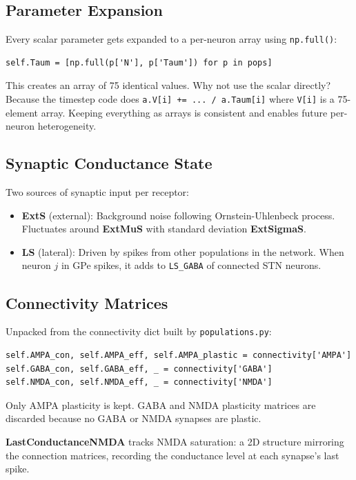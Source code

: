\documentclass[11pt,a4paper]{article}
\begin{document}
\subsection{Parameter Expansion}

Every scalar parameter gets expanded to a per-neuron array using \texttt{np.full()}:
\begin{lstlisting}
self.Taum = [np.full(p['N'], p['Taum']) for p in pops]
\end{lstlisting}

This creates an array of 75 identical values. Why not use the scalar directly? Because the timestep code does \texttt{a.V[i] += ... / a.Taum[i]} where \texttt{V[i]} is a 75-element array. Keeping everything as arrays is consistent and enables future per-neuron heterogeneity.

\subsection{Synaptic Conductance State}

Two sources of synaptic input per receptor:

\begin{itemize}
    \item \textbf{ExtS} (external): Background noise following Ornstein-Uhlenbeck process. Fluctuates around \textbf{ExtMuS} with standard deviation \textbf{ExtSigmaS}.
    \item \textbf{LS} (lateral): Driven by spikes from other populations in the network. When neuron $j$ in GPe spikes, it adds to \texttt{LS\_GABA} of connected STN neurons.
\end{itemize}

\subsection{Connectivity Matrices}

Unpacked from the connectivity dict built by \texttt{populations.py}:
\begin{lstlisting}
self.AMPA_con, self.AMPA_eff, self.AMPA_plastic = connectivity['AMPA']
self.GABA_con, self.GABA_eff, _ = connectivity['GABA']
self.NMDA_con, self.NMDA_eff, _ = connectivity['NMDA']
\end{lstlisting}

Only AMPA plasticity is kept. GABA and NMDA plasticity matrices are discarded because no GABA or NMDA synapses are plastic.

\textbf{LastConductanceNMDA} tracks NMDA saturation: a 2D structure mirroring the connection matrices, recording the conductance level at each synapse's last spike.
\end{document}
